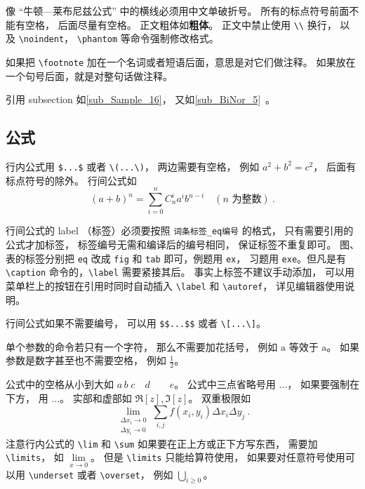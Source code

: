 像 “牛顿—莱布尼兹公式” 中的横线必须用中文单破折号。 所有的标点符号前面不能有空格， 后面尽量有空格。 正文粗体如\textbf{粗体}。 正文中禁止使用 \verb|\\| 换行， 以及 \verb|\noindent|， \verb|\phantom| 等命令强制修改格式。

如果把 \verb|\footnote| 加在一个名词或者短语后面，意思是对它们做注释。 如果放在一个句号后面，就是对整句话做注释。

引用 subsection 如\autoref{sub_Sample_16}， 又如\autoref{sub_BiNor_5}~。

\subsection{公式}
行内公式用 \verb|$...$| 或者 \verb|\(...\)|， 两边需要有空格， 例如 $a^2+b^2=c^2$， 后面有标点符号的除外。 行间公式如
\begin{equation}\label{eq_Sample_1}
(a+b)^n = \sum_{i=0}^n C_n^i a^i b^{n-i} \quad (\text{$n$ 为整数})~.
\end{equation}

行间公式的 label （标签）必须要按照 \verb|词条标签_eq编号| 的格式， 只有需要引用的公式才加标签， 标签编号无需和编译后的编号相同， 保证标签不重复即可。 图、表的标签分别把 \verb|eq| 改成 \verb|fig| 和 \verb|tab| 即可，例题用 \verb|ex|， 习题用 \verb|exe|。但凡是有 \verb|\caption| 命令的，\verb|\label| 需要紧接其后。 事实上标签不建议手动添加， 可以用菜单栏上的按钮在引用时同时自动插入 \verb|\label| 和 \verb|\autoref|， 详见编辑器使用说明。

行间公式如果不需要编号， 可以用 \verb|$$...$$| 或者 \verb|\[...\]|。


单个参数的命令若只有一个字符， 那么不需要加花括号， 例如 $\mathrm a$ 等效于 $\mathrm{a}$。 如果参数是数字甚至也不需要空格， 例如 $\frac12$。

公式中的空格从小到大如 $a\, b\; c\quad d\qquad e$。 公式中三点省略号用 $\dots$， 如果要强制在下方， 用 $\ldots$。 实部和虚部如 $\Re[z], \Im[z]$。 双重极限如
\begin{equation}
\lim_{\substack{\Delta x_i\to 0\\ \Delta y_i\to 0}} \sum_{i, j} f(x_i,y_i) \Delta x_i \Delta y_j~.
\end{equation}
注意行内公式的 \verb|\lim| 和 \verb|\sum| 如果要在正上方或正下方写东西， 需要加 \verb|\limits|， 如 $\lim\limits_{x\to 0}$。 但是 \verb|\limits| 只能给算符使用， 如果要对任意符号使用可以用 \verb|\underset| 或者 \verb|\overset|， 例如 $\underset{i \ge 0}{\bigcup}$。


